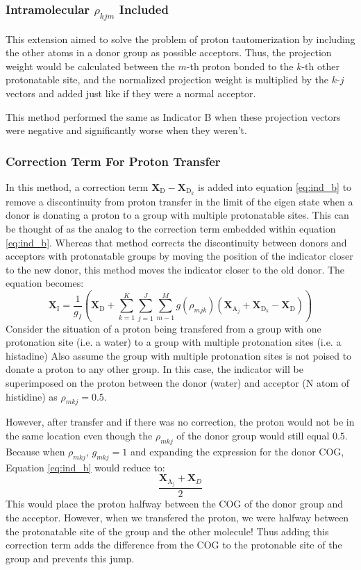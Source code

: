 \documentclass{article}
\newcommand{\mb}[1]{\mathbf{#1}}
\newcommand{\mr}[1]{\mathrm{#1}}
\begin{document}
\subsubsection{Intramolecular $\rho_{kjm}$ Included}\label{ss:indicator7}
This extension aimed to solve the problem of proton tautomerization by including the other atoms in a donor group as possible acceptors.
Thus, the projection weight would be calculated between the $m$-th proton bonded to the $k$-th other protonatable site, and the normalized projection weight is multiplied by the $k$-$j$ vectors and added just like if they were a normal acceptor.

This method performed the same as Indicator B when these projection vectors were negative and significantly worse when they weren't.

\subsubsection{Correction Term For Proton Transfer}\label{ss:indicator11}
In this method, a correction term $\mathbf{X}_\mr{D} - \mathbf{X}_{\mr{D}_k}$ is added into equation \ref{eq:ind_b} to remove a discontinuity from proton transfer in the limit of the eigen state when a donor is donating a proton to a group with multiple protonatable sites.
This can be thought of as the analog to the correction term embedded within equation \ref{eq:ind_b}.
Whereas that method corrects the discontinuity between donors and acceptors with protonatable groups by moving the position of the indicator closer to the new donor, this method moves the indicator closer to the old donor.
The equation becomes:
\begin{equation}\label{eq:ind_b_with_correction}
\mathbf{X}_\mr{I} = \frac{1}{g_I} \left( \mathbf{X}_\mr{D} + \sum^K_{k=1} \sum^J_{j=1}   \sum^M_{m-1} g(\rho_{mjk}) \left(\mathbf{X}_{\mr{A}_j} + \mathbf{X}_{\mr{D}_k} - \mathbf{X}_\mr{D}  \right) \right) 
\end{equation}
Consider the situation of a proton being transfered from a group with one protonation site (i.e. a water) to a group with multiple protonation sites (i.e. a histadine)
Also assume the group with multiple protonation sites is not poised to donate a proton to any other group.
In this case, the indicator will be superimposed on the proton between the donor (water) and acceptor (N atom of histidine) as $\rho_{mkj} = 0.5$.

However, after transfer and if there was no correction, the proton would not be in the same location even though the $\rho_{mkj}$ of the donor group would still equal $0.5$.
Because when $\rho_{mkj}$, $g_{mkj} = 1$ and expanding the expression for the donor COG, Equation \ref{eq:ind_b} would reduce to:
\begin{equation}
\frac{\mb{X}_{\mr{A}_j} + \mb{X}_D}{2}
\end{equation}
This would place the proton halfway between the COG of the donor group and the acceptor.
However, when we transfered the proton, we were halfway between the protonatable site of the group and the other molecule!
Thus adding this correction term adds the difference from the COG to the protonable site of the group and prevents this jump.
\end{document}
